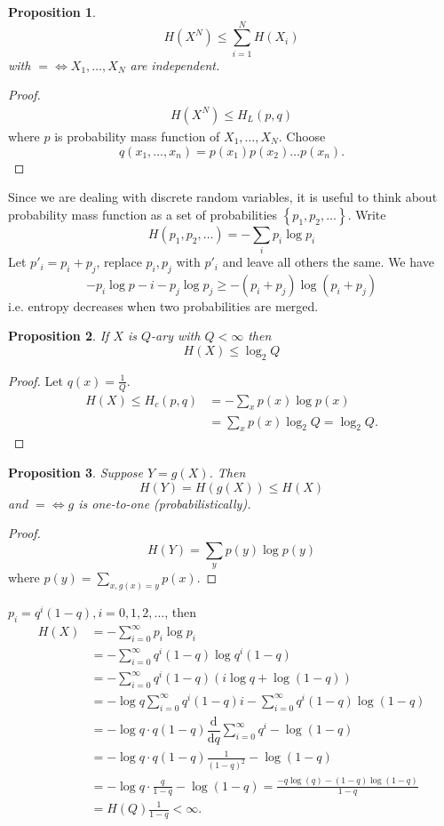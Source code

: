 \documentclass{report}
\newcommand{\df}{\mathrm{d}}
\newcommand{\dr}[2]{\dfrac{\df #1}{\df #2}}
\newcommand{\set}[1]{\left\lbrace #1 \right\rbrace}
\newtheorem{proposition}{Proposition}[section]
\theoremstyle{definition}
\theoremstyle{remark}
\numberwithin{equation}{section}
\begin{document}
\begin{proposition}
  \[
    H(X^N) \leq \sum_{i=1}^N H(X_i)  
  \] with $= \iff X_1, \ldots, X_N$ are independent.  
\end{proposition}

\begin{proof}
  \begin{align*}
    H(X^N) \leq H_L(p, q)
  \end{align*}
  where $p$ is probability mass function of $X_1, \ldots, X_N$. Choose \[q(x_1, \ldots, x_n) = p(x_1)p(x_2)\ldots p(x_n).\]
\end{proof}

Since we are dealing with discrete random variables, it is useful to think about probability mass function as a set of probabilities $\set{p_1, p_2, \ldots}$. Write \[H(p_1, p_2, \ldots) = -\sum_i p_i \log p_i\]
Let $p'_i = p_i + p_j$, replace $p_i, p_j$ with $p'_i$ and leave all others the same. We have \[
-p_i \log p-i - p_j \log p_j \geq -(p_i + p_j)\log (p_i + p_j) 
\] i.e. entropy decreases when two probabilities are merged.

\begin{proposition}
  If $X$ is $Q$-ary with $Q < \infty$ then \[H(X) \leq \log_2 Q\]
\end{proposition}
\begin{proof}
  Let $q(x) = \frac{1}{Q}$.
  \begin{align*}
    H(X) \leq H_c(p, q) & = -\sum_x p(x) \log p(x) \\
    & = \sum_x p(x) \log_2 Q = \log_2 Q.
  \end{align*}
\end{proof}

\begin{proposition}
  Suppose $Y = g(X)$. Then \[
    H(Y) = H(g(X)) \leq H(X)
  \] and $= \iff g$ is one-to-one (probabilistically).
\end{proposition}
\begin{proof}
  \[
   H(Y) = \sum_{y} p(y) \log p(y)
  \] where $p(y) = \sum_{x, g(x) = y} p(x)$.
\end{proof}

$p_i = q^i(1 - q), i = 0, 1, 2, \ldots$, then \begin{align*}
  H(X) & = -\sum_{i=0}^\infty p_i \log p_i \\
  & = -\sum_{i=0}^\infty q^i(1-q)\log q^i(1-q) \\
  & = -\sum_{i=0}^\infty q^i(1-q)\left(i\log q + \log(1-q)\right) \\
  & = -\log q\sum_{i=0}^\infty q^i(1-q)i - \sum_{i=0}^\infty q^i(1-q)\log(1-q) \\
  & = -\log q \cdot q(1 - q) \dr{}{q} \sum_{i=0}^\infty q^i - \log(1-q) \\
  & = - \log q \cdot q(1 - q) \frac{1}{(1-q)^2} - \log(1-q) \\
  & =  - \log q \cdot \frac{q}{1-q} - \log(1-q) = \frac{-q\log(q) - (1 - q)\log(1-q)}{1- q} \\
  & = H(Q)\frac{1}{1 - q} < \infty.
\end{align*}
\end{document}
